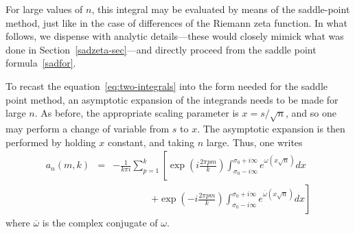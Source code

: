 \documentclass{amsart}
\begin{document}
For large values of $n$, this integral may be evaluated by means
of the saddle-point method, just like in the case of
differences of the Riemann zeta function.
% 
In what follows, we dispense with analytic details---these would
closely mimick what was done in Section~\ref{sadzeta-sec}---and directly proceed  
from the saddle point formula~\eqref{sadfor}.


To recast the equation~\eqref{eq:two-integrals} into the form needed
for the saddle point method, an asymptotic expansion of the
integrands needs to be made for large $n$. 
As before, the appropriate scaling parameter is $x=s/\sqrt{n}$,
and so one may perform a change of variable from $s$ to $x$. The asymptotic
expansion is then performed by holding $x$ constant, and taking $n$
large. Thus, one writes 
\begin{eqnarray}
a_{n}(m,k) & = & -\frac{1}{k\pi i}\sum_{p=1}^{k}
\left[\exp\left(i\frac{2\pi pm}{k}\right)
\int_{\sigma_{0}-i\infty}^{\sigma_{0}+i\infty}e^{\omega(x\sqrt{n})}dx\right.
\label{eq:saddle}\\
 &  & \qquad \qquad \left.+\exp\left(-i\frac{2\pi pm}{k}\right)
\int_{\sigma_{0}-i\infty}^{\sigma_{0}+i\infty}
e^{\overline{\omega}(x\sqrt{n})}dx\right]
\end{eqnarray}
 where $\overline{\omega}$ is the complex conjugate of $\omega$. 
\end{document}
